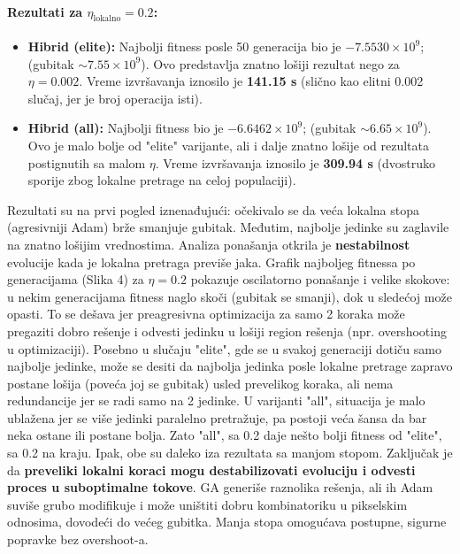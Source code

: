 \documentclass[a4paper,12pt]{article}
\begin{document}
\paragraph{Rezultati za $\eta_{\text{lokalno}} = 0.2$:}
\begin{itemize}
\item \textbf{Hibrid (elite):} Najbolji fitness posle 50 generacija bio je \boldmath$-7.5530 \times 10^9$\unboldmath; (gubitak $\sim 7.55\times 10^9$). Ovo predstavlja znatno lošiji rezultat nego za $\eta=0.002$. Vreme izvršavanja iznosilo je \textbf{141.15 s} (slično kao elitni 0.002 slučaj, jer je broj operacija isti).
\item \textbf{Hibrid (all):} Najbolji fitness bio je \boldmath$-6.6462 \times 10^9$\unboldmath; (gubitak $\sim 6.65\times 10^9$). Ovo je malo bolje od "elite" varijante, ali i dalje znatno lošije od rezultata postignutih sa malom $\eta$. Vreme izvršavanja iznosilo je \textbf{309.94 s} (dvostruko sporije zbog lokalne pretrage na celoj populaciji).
\end{itemize}
Rezultati su na prvi pogled iznenađujući: očekivalo se da veća lokalna stopa (agresivniji Adam) brže smanjuje gubitak. Međutim, najbolje jedinke su zaglavile na znatno lošijim vrednostima. Analiza ponašanja otkrila je \textbf{nestabilnost} evolucije kada je lokalna pretraga previše jaka. Grafik najboljeg fitnessa po generacijama (Slika 4) za $\eta=0.2$ pokazuje oscilatorno ponašanje i velike skokove: u nekim generacijama fitness naglo skoči (gubitak se smanji), dok u sledećoj može opasti. To se dešava jer preagresivna optimizacija za samo 2 koraka može pregaziti dobro rešenje i odvesti jedinku u lošiji region rešenja (npr. overshooting u optimizaciji). Posebno u slučaju "elite", gde se u svakoj generaciji dotiču samo najbolje jedinke, može se desiti da najbolja jedinka posle lokalne pretrage zapravo postane lošija (poveća joj se gubitak) usled prevelikog koraka, ali nema redundancije jer se radi samo na 2 jedinke. U varijanti "all", situacija je malo ublažena jer se više jedinki paralelno pretražuje, pa postoji veća šansa da bar neka ostane ili postane bolja. Zato "all", sa 0.2 daje nešto bolji fitness od "elite", sa 0.2 na kraju. Ipak, obe su daleko iza rezultata sa manjom stopom. Zaključak je da \textbf{preveliki lokalni koraci mogu destabilizovati evoluciju i odvesti proces u suboptimalne tokove}. GA generiše raznolika rešenja, ali ih Adam suviše grubo modifikuje i može uništiti dobru kombinatoriku u pikselskim odnosima, dovodeći do većeg gubitka. Manja stopa omogućava postupne, sigurne popravke bez overshoot-a.
\end{document}
